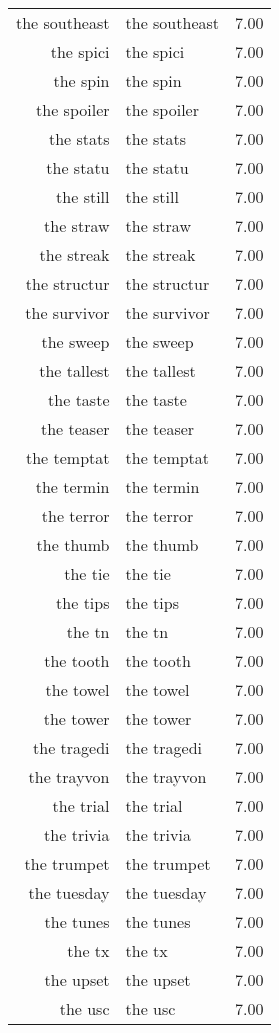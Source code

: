 \begin{table}[ht]
\begin{tabular}{rlr}
  the southeast & the southeast & 7.00 \\ 
  the spici & the spici & 7.00 \\ 
  the spin & the spin & 7.00 \\ 
  the spoiler & the spoiler & 7.00 \\ 
  the stats & the stats & 7.00 \\ 
  the statu & the statu & 7.00 \\ 
  the still & the still & 7.00 \\ 
  the straw & the straw & 7.00 \\ 
  the streak & the streak & 7.00 \\ 
  the structur & the structur & 7.00 \\ 
  the survivor & the survivor & 7.00 \\ 
  the sweep & the sweep & 7.00 \\ 
  the tallest & the tallest & 7.00 \\ 
  the taste & the taste & 7.00 \\ 
  the teaser & the teaser & 7.00 \\ 
  the temptat & the temptat & 7.00 \\ 
  the termin & the termin & 7.00 \\ 
  the terror & the terror & 7.00 \\ 
  the thumb & the thumb & 7.00 \\ 
  the tie & the tie & 7.00 \\ 
  the tips & the tips & 7.00 \\ 
  the tn & the tn & 7.00 \\ 
  the tooth & the tooth & 7.00 \\ 
  the towel & the towel & 7.00 \\ 
  the tower & the tower & 7.00 \\ 
  the tragedi & the tragedi & 7.00 \\ 
  the trayvon & the trayvon & 7.00 \\ 
  the trial & the trial & 7.00 \\ 
  the trivia & the trivia & 7.00 \\ 
  the trumpet & the trumpet & 7.00 \\ 
  the tuesday & the tuesday & 7.00 \\ 
  the tunes & the tunes & 7.00 \\ 
  the tx & the tx & 7.00 \\ 
  the upset & the upset & 7.00 \\ 
  the usc & the usc & 7.00 \\ 

\end{tabular}
\end{table}
